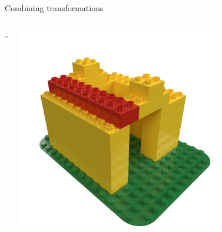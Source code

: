 \begin{frame}{Combining transformations}
\begin{columns}[c]
\begin{column}{0.05\textwidth}
            \centering
            =
        \end{column}\begin{column}{0.3\textwidth}
            \centering
            \includegraphics[width=0.7\textwidth]{images/03_transformation_framework/duplo_house_roof_step.png}
        \end{column}
    \end{columns} 
\end{frame}


